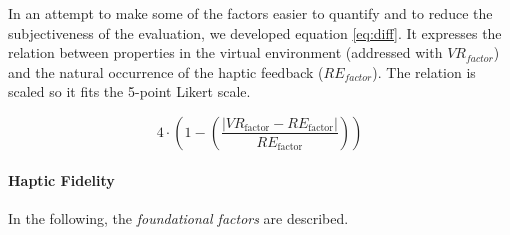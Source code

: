 In an attempt to make some of the factors easier to quantify and to reduce the subjectiveness of the evaluation, we developed equation \ref{eq:diff}. It expresses the relation between properties in the virtual environment (addressed with $VR_{factor}$) and the natural occurrence of the haptic feedback ($RE_{factor}$). The relation is scaled so it fits the 5-point Likert scale.

\begin{equation}    
4 \cdot \left(1 - \left(\frac{\left|VR_{\text{factor}} - RE_{\text{factor}}\right|}{RE_{\text{factor}}}\right)\right)
\label{eq:diff}
\end{equation}



\paragraph{Haptic Fidelity}
\label{sec:foundationallimiting}

In the following, the \textit{foundational factors} are described.

